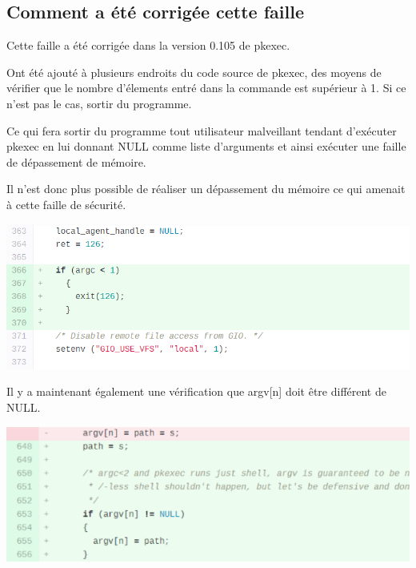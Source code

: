 \documentclass[12pt,a4paper]{article}
\begin{document}
		\subsection{Comment a été corrigée cette faille}
            \begin{flushleft}
                \noindent Cette faille a été corrigée dans la version 0.105 de pkexec.
                \item Ont été ajouté à plusieurs endroits du code source de pkexec, des moyens de vérifier que le nombre d'élements entré dans la commande est supérieur à 1. Si ce n'est pas le cas, sortir du programme. 
                \item Ce qui fera sortir du programme tout utilisateur malveillant tendant d'exécuter pkexec en lui donnant NULL comme liste d'arguments et ainsi exécuter une faille de dépassement de mémoire. \cite{pkexeclo25:online} 
                \item Il n'est donc plus possible de réaliser un dépassement du mémoire ce qui amenait à cette faille de sécurité.
                \begin{center}
                    \includegraphics[scale=0.5]{verifargcsize}
                    \cite{securitytrack:online}
                \end{center}
                \item Il y a maintenant également une vérification que argv[n] doit être différent de NULL.
                \begin{center}
                    \includegraphics[scale=0.5]{verifisnull}
                    \cite{securitytrack:online}
                \end{center}
            \end{flushleft}
            
\end{document}
